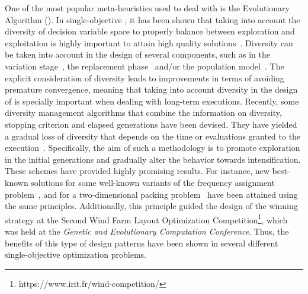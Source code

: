 One of the most popular meta-heuristics used to deal with \MOPS{} is the Evolutionary Algorithm (\EA{}).
%
In single-objective \EAS{}, it has been shown that taking into account the diversity of decision variable space
to properly balance between exploration and exploitation is highly important to attain high quality 
solutions~\cite{Joel:BALANCE_DIVERSITY}.
%
Diversity can be taken into account in the design of several components, such as in the variation 
stage~\cite{Joel:FUZZY_ADAPTIVE_GA,Joel:CROSSOVER_DIVERSITY}, the replacement phase~\cite{Joel:MULTI_DYNAMIC} 
and/or the population model~\cite{Joel:SAWTOOTH}.
%
The explicit consideration of diversity leads to improvements in terms of avoiding premature convergence, 
meaning that taking into account diversity in the design of \EAS{} is specially important when dealing 
with long-term executions.
%
Recently, some diversity management algorithms that combine the information on diversity, stopping criterion and elapsed 
generations have been devised.
%
They have yielded a gradual loss of diversity that depends on the time or evaluations granted to the 
execution~\cite{Joel:MULTI_DYNAMIC}.
%
Specifically, the aim of such a methodology is to promote exploration in the initial generations and gradually alter the 
behavior towards intensification.
%
These schemes have provided highly promising results.
%
For instance, new best-known solutions for some well-known variants of the frequency assignment problem~\cite{Segura:17},
and for a two-dimensional packing problem~\cite{Joel:MULTI_DYNAMIC} have been attained using the same principles.
%
Additionally, this principle guided the design of the winning strategy at the Second Wind Farm Layout Optimization 
Competition\footnote{https://www.irit.fr/wind-competition/}, which was held at the {\em Genetic and Evolutionary 
Computation Conference}.
%
Thus, the benefits of this type of design patterns have been shown in several different single-objective optimization problems.

